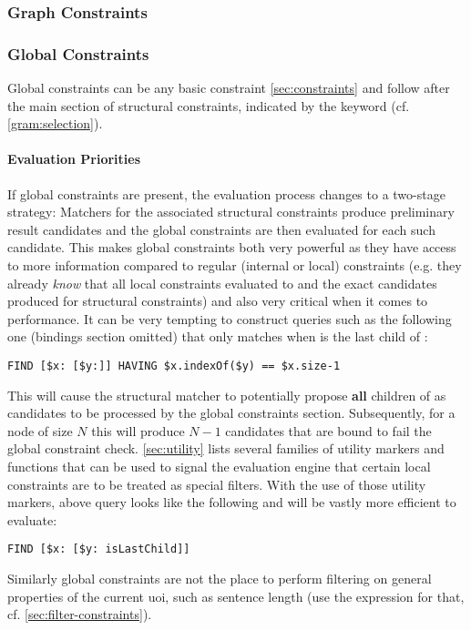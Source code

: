 \documentclass[11pt,a4paper]{article}
\begin{document}
\subsubsection{Graph Constraints}
\label{sec:graph-constraints}


\subsubsection{Global Constraints}
\label{sec:global-constraints}

Global constraints can be any basic constraint \cref{sec:constraints} and follow after the main section of structural constraints, indicated by the  keyword (cf. \cref{gram:selection}).

\paragraph{Evaluation Priorities}
\noindent If global constraints are present, the evaluation process changes to a two-stage strategy:
Matchers for the associated structural constraints produce preliminary result candidates and the global constraints are then evaluated for each such candidate.
This makes global constraints both very powerful as they have access to more information compared to regular (internal or local) constraints (e.g. they already \textit{know} that all local constraints evaluated to  and the exact candidates produced for structural constraints) and also very critical when it comes to performance.
It can be very tempting to construct queries such as the following one (bindings section omitted) that only matches when  is the last child of :
\begin{Verbatim}[samepage=true]
FIND [$x: [$y:]] HAVING $x.indexOf($y) == $x.size-1
\end{Verbatim}
This will cause the structural matcher to potentially propose \textbf{all} children of  as candidates to be processed by the global constraints section.
Subsequently, for a node of size $N$ this will produce $N-1$ candidates that are bound to fail the global constraint check.
\cref{sec:utility} lists several families of utility markers and functions that can be used to signal the evaluation engine that certain local constraints are to be treated as special filters.
With the use of those utility markers, above query looks like the following and will be vastly more efficient to evaluate:
\begin{Verbatim}[samepage=true]
FIND [$x: [$y: isLastChild]]
\end{Verbatim}
Similarly global constraints are not the place to perform filtering on general properties of the current \ac{uoi}, such as sentence length (use the  expression for that, cf. \cref{sec:filter-constraints}).
\end{document}
